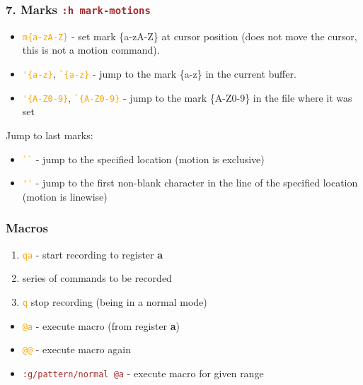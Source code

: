 \documentclass{beamer}
\newcommand{\vimnormal}[1]{\texttt{\textcolor{orange}{#1}}}
\newcommand{\vimcommand}[1]{\texttt{\textcolor{brown}{#1}}}
\newcommand{\vimhelp}[1]{\vimcommand{:h #1}}
\begin{document}
\begin{frame}[fragile]
    \frametitle{7. Marks \vimhelp{mark-motions}}
    \begin{itemize}
        \item \vimnormal{m\{a-zA-Z\}}                                - set mark \{a-zA-Z\} at cursor position (does not move the cursor, this is not a motion command).
        \item \vimnormal{\'{}\{a-z\}}, \vimnormal{\`{}\{a-z\}}       - jump to the mark \{a-z\} in the current buffer.
        \item \vimnormal{\'{}\{A-Z0-9\}}, \vimnormal{\`{}\{A-Z0-9\}} - jump to the mark \{A-Z0-9\} in the file where it was set
    \end{itemize}
    Jump to last marks:
    \begin{itemize}
        \item \vimnormal{\`{}\`{}} - jump to the specified location (motion is exclusive)
        \item \vimnormal{\'{}\'{}} - jump to the first non-blank character in the line of the specified location (motion is linewise)
    \end{itemize}
\end{frame}

\begin{frame}
    \frametitle{Macros}
    \begin{enumerate}
        \item \vimnormal{qa} - start recording to register \textbf{a}
        \item series of commands to be recorded
        \item \vimnormal{q} stop recording (being in a normal mode)
    \end{enumerate}
    \begin{itemize}
        \item \vimnormal{@a} - execute macro (from register \textbf{a})
        \item \vimnormal{@@} - execute macro again
        \item \vimcommand{:g/pattern/normal @a} - execute macro for given range
    \end{itemize}
\end{frame}
\end{document}
